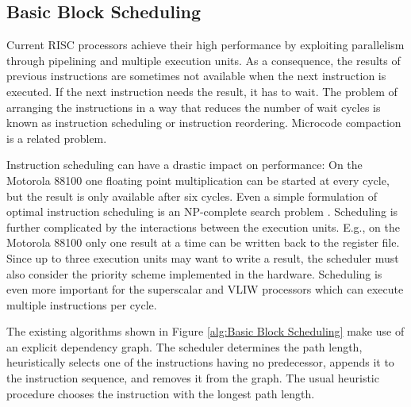 

\subsection{Basic Block Scheduling}


Current RISC processors achieve their high performance by exploiting parallelism through
pipelining and multiple execution units. As a consequence, the results of previous instructions
are sometimes not available when the next instruction is executed. If the next
instruction needs the result, it has to wait. The problem of arranging the instructions
in a way that reduces the number of wait cycles is known as instruction scheduling or
instruction reordering. Microcode compaction is a related problem.

Instruction scheduling can have a drastic impact on performance: On the Motorola
88100 one floating point multiplication can be started at every cycle, but the result is only
available after six cycles. Even a simple formulation of optimal instruction scheduling
is an NP-complete search problem . Scheduling is further complicated by the
interactions between the execution units. E.g., on the Motorola 88100 only one result at
a time can be written back to the register file. Since up to three execution units may want
to write a result, the scheduler must also consider the priority scheme implemented in the
hardware. Scheduling is even more important for the superscalar and VLIW processors
 which can execute multiple instructions per cycle.

 The existing algorithms shown in Figure \ref{alg:Basic Block Scheduling} make use of an explicit dependency graph. The scheduler
 determines the path length, heuristically selects one of the instructions having 
 no predecessor, appends it to the instruction sequence, and removes it from the graph. The usual
 heuristic procedure chooses the instruction with the longest path length.


